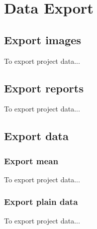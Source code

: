 \chapter{Data Export}
\section{Export images}
To export project data...

\section{Export reports}
To export project data...

\section{Export data}
\subsection{Export mean}
To export project data...

\subsection{Export plain data}
To export project data...